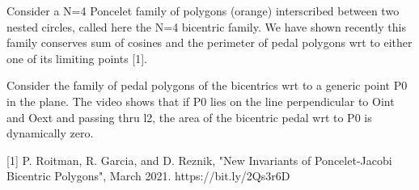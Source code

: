 Consider a N=4 Poncelet family of polygons (orange) interscribed between two nested circles, called here the N=4 bicentric family. We have shown recently this family conserves sum of cosines and the perimeter of pedal polygons wrt to either one of its limiting points [1].

Consider the family of pedal polygons of the bicentrics wrt to a generic point P0 in the plane. The video shows that if P0 lies on the line perpendicular to Oint and Oext and passing thru l2, the area of the bicentric pedal wrt to P0 is dynamically zero.

[1]  P. Roitman, R. Garcia, and D. Reznik, "New Invariants of Poncelet-Jacobi Bicentric Polygons", March 2021. https://bit.ly/2Qs3r6D